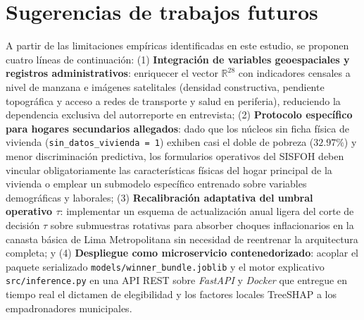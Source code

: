 \section{Sugerencias de trabajos futuros}

A partir de las limitaciones empíricas identificadas en este estudio, se proponen cuatro líneas de continuación: (1) \textbf{Integración de variables geoespaciales y registros administrativos}: enriquecer el vector $\mathbb{R}^{28}$ con indicadores censales a nivel de manzana e imágenes satelitales (densidad constructiva, pendiente topográfica y acceso a redes de transporte y salud en periferia), reduciendo la dependencia exclusiva del autorreporte en entrevista; (2) \textbf{Protocolo específico para hogares secundarios allegados}: dado que los núcleos sin ficha física de vivienda (\texttt{sin\_datos\_vivienda = 1}) exhiben casi el doble de pobreza ($32.97\%$) y menor discriminación predictiva, los formularios operativos del SISFOH deben vincular obligatoriamente las características físicas del hogar principal de la vivienda o emplear un submodelo específico entrenado sobre variables demográficas y laborales; (3) \textbf{Recalibración adaptativa del umbral operativo $\tau$}: implementar un esquema de actualización anual ligera del corte de decisión $\tau$ sobre submuestras rotativas para absorber choques inflacionarios en la canasta básica de Lima Metropolitana sin necesidad de reentrenar la arquitectura completa; y (4) \textbf{Despliegue como microservicio contenedorizado}: acoplar el paquete serializado \texttt{models/winner\_bundle.joblib} y el motor explicativo \texttt{src/inference.py} en una API REST sobre \textit{FastAPI} y \textit{Docker} que entregue en tiempo real el dictamen de elegibilidad y los factores locales TreeSHAP a los empadronadores municipales.
